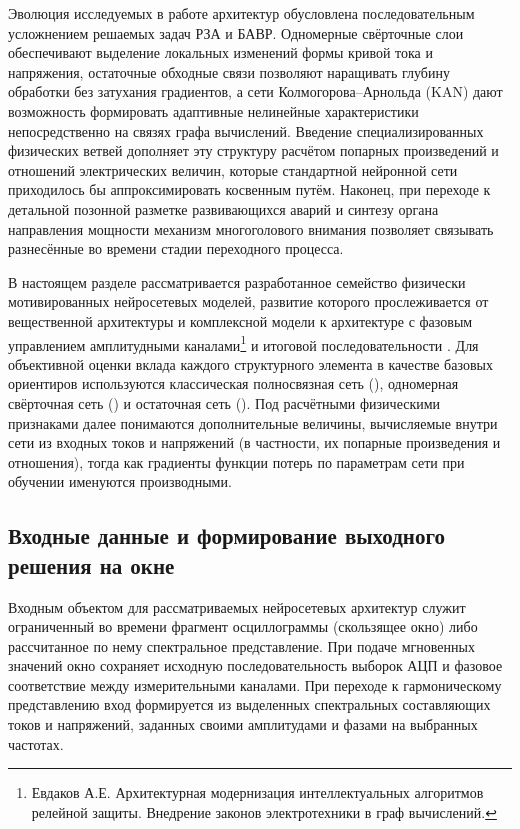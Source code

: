 Эволюция исследуемых в работе архитектур обусловлена последовательным
усложнением решаемых задач РЗА и БАВР. Одномерные свёрточные слои
обеспечивают выделение локальных изменений формы кривой тока и
напряжения, остаточные обходные связи позволяют наращивать глубину
обработки без затухания градиентов, а сети Колмогорова--Арнольда (KAN)
дают возможность формировать адаптивные нелинейные характеристики
непосредственно на связях графа вычислений. Введение специализированных
физических ветвей дополняет эту структуру расчётом попарных произведений
и отношений электрических величин, которые стандартной нейронной сети
приходилось бы аппроксимировать косвенным путём. Наконец, при переходе
к детальной позонной разметке развивающихся аварий и синтезу органа
направления мощности механизм многоголового внимания позволяет связывать
разнесённые во времени стадии переходного процесса.

В настоящем разделе рассматривается разработанное семейство физически
мотивированных нейросетевых моделей, развитие которого прослеживается от
вещественной архитектуры  и комплексной модели
 к архитектуре  с фазовым управлением
амплитудными каналами\footnote{Евдаков А.Е. Архитектурная модернизация
интеллектуальных алгоритмов релейной защиты. Внедрение законов
электротехники в граф вычислений.} и итоговой последовательности
. Для объективной оценки вклада каждого
структурного элемента в качестве базовых ориентиров используются
классическая полносвязная сеть (), одномерная свёрточная
сеть () и остаточная сеть (). Под
расчётными физическими признаками далее понимаются дополнительные
величины, вычисляемые внутри сети из входных токов и напряжений (в
частности, их попарные произведения и отношения), тогда как градиенты
функции потерь по параметрам сети при обучении именуются производными.

\subsection{Входные данные и формирование выходного решения на окне}
\label{sec:ch4_input_windows}

Входным объектом для рассматриваемых нейросетевых архитектур служит
ограниченный во времени фрагмент осциллограммы (скользящее окно) либо
рассчитанное по нему спектральное представление. При подаче мгновенных
значений окно сохраняет исходную последовательность выборок АЦП и
фазовое соответствие между измерительными каналами. При переходе к
гармоническому представлению вход формируется из выделенных спектральных
составляющих токов и напряжений, заданных своими амплитудами и фазами
на выбранных частотах.

